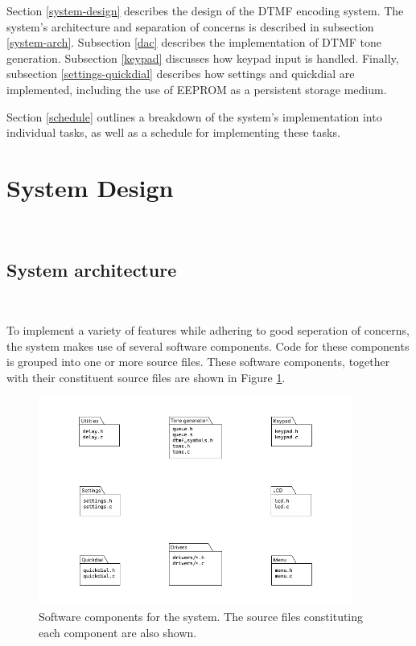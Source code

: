 \documentclass[11pt,a4paper,twocolumn]{scrartcl}
\begin{document}
   Section \ref{system-design} describes the design of the DTMF encoding system. The system's architecture and separation of concerns is described in subsection \ref{system-arch}. Subsection \ref{dac} describes the implementation of DTMF tone generation. Subsection \ref{keypad} discusses how keypad input is handled. Finally, subsection \ref{settings-quickdial} describes how settings and quickdial are implemented, including the use of EEPROM as a persistent storage medium.

   Section \ref{schedule} outlines a breakdown of the system's implementation into individual tasks, as well as a schedule for implementing these tasks.

\section{System Design}~\label{system-design}

\subsection{System architecture}~\label{system-arch}

To implement a variety of features while adhering to good seperation of concerns, the system makes use of several software components. Code for these components is grouped into one or more source files. These software components, together with their constituent source files are shown in Figure \ref{fig:software_components}.

\begin{figure}
   \centering
   \includegraphics[width=0.92\textwidth]{software_components}
   \caption{Software components for the system. The source files constituting each component are also shown.}
   \label{fig:software_components}
\end{figure}
\end{document}
